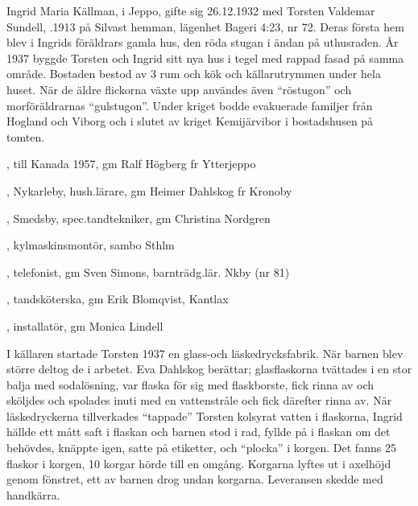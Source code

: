 %
Ingrid Maria Källman,  i Jeppo, gifte sig 26.12.1932 med Torsten Valdemar Sundell, .1913 på Silvast hemman, lägenhet Bageri 4:23, nr 72. Deras första hem blev i Ingrids föräldrars gamla hus, den röda stugan i ändan på uthusraden. År 1937 byggde 	Torsten och Ingrid sitt nya hus i tegel med rappad fasad på samma område. Bostaden bestod av 3 rum och kök och källarutrymmen under hela huset. När de äldre flickorna växte upp användes även ``röstugon'' och morföräldrarnas ``gulstugon''. Under kriget bodde evakuerade 	familjer från Hogland och Viborg och i slutet av kriget Kemijärvibor i 	bostadshusen på tomten.
\begin{jhchildren}
  \item {}, till Kanada 1957, gm Ralf Högberg fr Ytterjeppo
  \item {}, Nykarleby, hush.lärare, gm Heimer Dahlskog fr Kronoby
  \item {}, Smedsby, spec.tandtekniker, gm Christina Nordgren
  \item {}, kylmaskinsmontör, sambo Sthlm
  \item {}, telefonist, gm Sven Simons, barnträdg.lär. Nkby (nr 81)
  \item {}, tandsköterska, gm Erik Blomqvist, Kantlax
  \item {}, installatör, gm Monica Lindell
\end{jhchildren}

I källaren startade Torsten 1937 en glass-och läskedrycksfabrik. När barnen blev större deltog de i arbetet. Eva Dahlskog berättar; glasflaskorna tvättades i en stor balja med sodalösning, var flaska för sig med flaskborste, fick rinna av och sköljdes och spolades inuti med en vattenstråle och fick därefter rinna av. När läskedryckerna tillverkades ``tappade'' Torsten kolsyrat vatten i flaskorna, Ingrid hällde ett mått saft i flaskan och barnen stod i rad, fyllde på i flaskan om det behövdes,	knäppte igen, satte på etiketter, och ``plocka'' i korgen. Det fanns 25 flaskor i korgen, 10 korgar hörde till en omgång. Korgarna lyftes ut i axelhöjd genom fönstret, ett av barnen drog undan korgarna. Leveransen 	skedde med handkärra.

